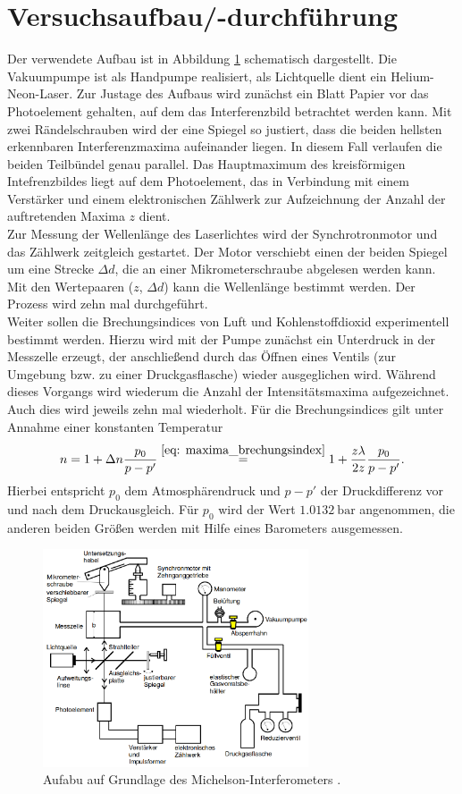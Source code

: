 \section{Versuchsaufbau/-durchführung}
Der verwendete Aufbau ist in Abbildung \ref{fig: aufbau} schematisch dargestellt. Die Vakuumpumpe ist als Handpumpe
realisiert, als Lichtquelle dient ein Helium-Neon-Laser. Zur Justage des Aufbaus wird zunächst ein Blatt Papier vor das Photoelement gehalten,
auf dem das Interferenzbild betrachtet werden kann. Mit zwei Rändelschrauben wird der eine Spiegel so justiert,
dass die beiden hellsten erkennbaren Interferenzmaxima
aufeinander liegen. In diesem Fall verlaufen die beiden Teilbündel genau parallel. Das Hauptmaximum des kreisförmigen Intefrenzbildes
liegt auf dem Photoelement, das in Verbindung mit einem Verstärker und einem elektronischen Zählwerk zur Aufzeichnung der Anzahl
der auftretenden Maxima $z$ dient.\\
Zur Messung der Wellenlänge des Laserlichtes wird der Synchrotronmotor und das Zählwerk zeitgleich gestartet. Der Motor verschiebt einen
der beiden Spiegel um eine Strecke $\Delta d$, die an einer Mikrometerschraube abgelesen werden kann. Mit den Wertepaaren ($z$, $\Delta d$) kann
die Wellenlänge bestimmt werden. Der Prozess wird zehn mal durchgeführt. \\
Weiter sollen die Brechungsindices von Luft und Kohlenstoffdioxid experimentell bestimmt werden. Hierzu  wird mit der Pumpe zunächst ein Unterdruck
in der Messzelle erzeugt, der anschließend
durch das Öffnen eines Ventils (zur Umgebung bzw. zu einer Druckgasflasche) wieder ausgeglichen wird. Während dieses Vorgangs wird wiederum die
Anzahl der Intensitätsmaxima aufgezeichnet. Auch dies wird jeweils zehn mal wiederholt. Für die Brechungsindices gilt unter Annahme einer konstanten
Temperatur
\begin{equation}
  n = 1 + \Delta n \frac{p_0}{p - p'} \overset{\eqref{eq: maxima_brechungsindex}}{=} 1 + \frac{z \lambda}{2z} \frac{p_0}{p - p'} .
\end{equation}
Hierbei entspricht $p_0$ dem Atmosphärendruck und $p-p'$ der Druckdifferenz vor und nach dem Druckausgleich. Für $p_0$ wird der Wert $\SI{1.0132}{\bar}$ angenommen,
die anderen beiden Größen werden mit Hilfe eines Barometers ausgemessen.
\begin{figure}
  \centering
  \includegraphics[width = 0.7\textwidth]{table/aufbau.png}
  \caption{Aufabu auf Grundlage des Michelson-Interferometers \cite{anleitung401}.}
  \label{fig: aufbau}
\end{figure}
